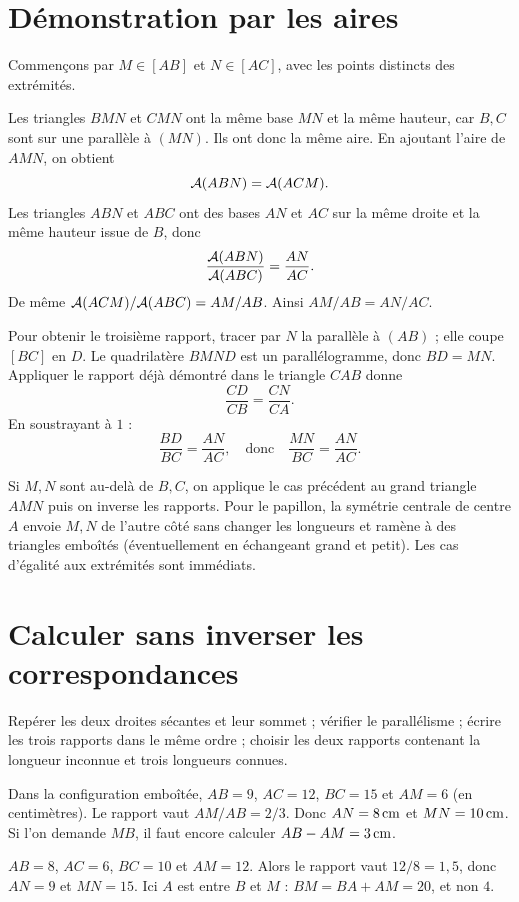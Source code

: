 \documentclass[../cours_3e.tex]{subfiles}
\begin{document}
\section{Démonstration par les aires}
Commençons par $M\in[AB]$ et $N\in[AC]$, avec les points distincts des extrémités.
\begin{demonstration}
Les triangles $BMN$ et $CMN$ ont la même base $MN$ et la même hauteur, car $B,C$ sont sur une parallèle à $(MN)$. Ils ont donc la même aire.
En ajoutant l'aire de $AMN$, on obtient
\[\mathcal{A}(ABN)=\mathcal{A}(ACM).\]
Les triangles $ABN$ et $ABC$ ont des bases $AN$ et $AC$ sur la même droite et la même hauteur issue de $B$, donc
\[\frac{\mathcal{A}(ABN)}{\mathcal{A}(ABC)}=\frac{AN}{AC}.\]
De même $\mathcal{A}(ACM)/\mathcal{A}(ABC)=AM/AB$. Ainsi $AM/AB=AN/AC$.

Pour obtenir le troisième rapport, tracer par $N$ la parallèle à $(AB)$ ; elle coupe $[BC]$ en $D$. Le quadrilatère $BMND$ est un parallélogramme, donc $BD=MN$. Appliquer le rapport déjà démontré dans le triangle $CAB$ donne
\[\frac{CD}{CB}=\frac{CN}{CA}.\]
En soustrayant à $1$ :
\[\frac{BD}{BC}=\frac{AN}{AC},\quad\text{donc}\quad
\frac{MN}{BC}=\frac{AN}{AC}.\]
\end{demonstration}
Si $M,N$ sont au-delà de $B,C$, on applique le cas précédent au grand triangle $AMN$ puis on inverse les rapports. Pour le papillon, la symétrie centrale de centre $A$ envoie $M,N$ de l'autre côté sans changer les longueurs et ramène à des triangles emboîtés (éventuellement en échangeant grand et petit). Les cas d'égalité aux extrémités sont immédiats.
\section{Calculer sans inverser les correspondances}
\begin{methode}
Repérer les deux droites sécantes et leur sommet ; vérifier le parallélisme ; écrire les trois rapports dans le même ordre ; choisir les deux rapports contenant la longueur inconnue et trois longueurs connues.
\end{methode}
\begin{exemple}
Dans la configuration emboîtée, $AB=9$, $AC=12$, $BC=15$ et $AM=6$ (en centimètres). Le rapport vaut $AM/AB=2/3$. Donc $AN=8\,\mathrm{cm}$ et $MN=10\,\mathrm{cm}$.
Si l'on demande $MB$, il faut encore calculer $AB-AM=3\,\mathrm{cm}$.
\end{exemple}
\begin{exemple}[Papillon]
$AB=8$, $AC=6$, $BC=10$ et $AM=12$. Alors le rapport vaut $12/8=1{,}5$, donc $AN=9$ et $MN=15$. Ici $A$ est entre $B$ et $M$ : $BM=BA+AM=20$, et non $4$.
\end{exemple}
\end{document}
